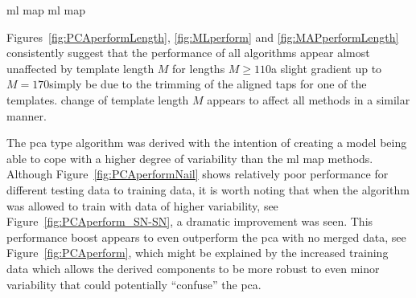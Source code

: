 \DIFaddbegin \label{corrections:ML}\gls{ml} \gls{map} \gls{ml} \gls{map} 

\DIFaddend Figures~\ref{fig:PCAperformLength}, \ref{fig:MLperform} and \ref{fig:MAPperformLength} consistently suggest that the performance of all algorithms appear almost unaffected by template length $M$ for lengths $M\geq110$\DIFdelbegin {}\DIFdelend \DIFaddbegin {}\DIFaddend a slight gradient \DIFaddbegin {}\DIFaddend up to $M=170$\DIFdelbegin {}\DIFdelend \DIFaddbegin {}\DIFaddend simply be due to the trimming of the aligned taps for one of the templates. \DIFdelbegin {}\DIFdelend \DIFaddbegin {}\DIFaddend change of template length $M$ \DIFaddbegin {}\DIFaddend appears to affect all methods in a similar manner.

The \DIFdelbegin {}\DIFdelend \DIFaddbegin \gls{pca} \DIFaddend type algorithm was derived with the intention of creating a model being able to cope with a higher degree of variability than the \DIFdelbegin {}\DIFdelend \DIFaddbegin \gls{ml} \gls{map} \DIFaddend methods. Although Figure~\ref{fig:PCAperformNail} shows relatively poor performance for different testing data to training data, it is worth noting that when the algorithm was allowed to train with data of higher variability, see Figure~\ref{fig:PCAperform_SN-SN}, a dramatic improvement was seen. This performance boost appears to even outperform the \DIFdelbegin {}\DIFdelend \DIFaddbegin \gls{pca} \DIFaddend with no merged data, see Figure~\ref{fig:PCAperform}, which might be explained by the increased training data which allows the derived components to be more robust to even minor variability that could potentially ``confuse'' the \DIFdelbegin {}\DIFdelend \DIFaddbegin \gls{pca}\DIFaddend .


